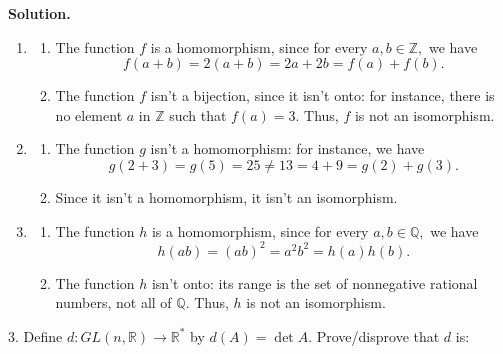 \documentclass[10pt,]{book}
\theoremstyle{plain}
\theoremstyle{definition}
\theoremstyle{definition}
\theoremstyle{definition}
\theoremstyle{definition}
\numberwithin{equation}{section}
\def\Z{\mathbb{Z}}
\def\R{\mathbb{R}}
\def\Q{\mathbb{Q}}
\begin{document}
\begin{exerciselist}
\begin{enumerate}[label=(\alph*)]
\end{enumerate}
%
\par\smallskip
\par\smallskip
\noindent\textbf{Solution.}\hypertarget{solution-22}{}\quad
\leavevmode%
\begin{enumerate}[label=(\alph*)]
\item\hypertarget{li-168}{}%
\begin{enumerate}[label=\roman*.]
\item\hypertarget{li-169}{}The function \(f\) is a homomorphism, since for every \(a,b \in
\Z,\) we have%
\begin{equation*}
f(a+b)=2(a+b)=2a+2b=f(a)+f(b).
\end{equation*}
%
\item\hypertarget{li-170}{}The function \(f\) isn't a bijection, since it isn't onto: for instance, there is no element \(a\) in \(\Z\) such that \(f(a)=3\). Thus, \(f\) is not an isomorphism.%
\end{enumerate}
%
\item\hypertarget{li-171}{}%
\begin{enumerate}[label=\roman*.]
\item\hypertarget{li-172}{}The function \(g\) isn't a homomorphism: for instance, we have%
\begin{equation*}
g(2+3)=g(5)=25\neq 13=4+9=g(2)+g(3).
\end{equation*}
%
\item\hypertarget{li-173}{}Since it isn't a homomorphism, it isn't an isomorphism.%
\end{enumerate}
%
\item\hypertarget{li-174}{}%
\begin{enumerate}[label=\roman*.]
\item\hypertarget{li-175}{}The function \(h\) is a homomorphism, since for every \(a,b \in
\Q,\) we have%
\begin{equation*}
h(ab)=(ab)^2=a^2b^2=h(a)h(b).
\end{equation*}
%
\item\hypertarget{li-176}{}The function \(h\) isn't onto: its range is the set of nonnegative rational numbers, not all of \(\Q\). Thus, \(h\) is not an isomorphism.%
\end{enumerate}
%
\end{enumerate}
\item[3.]\hypertarget{exercise-23}{}Define \(d : GL(n,\R)\to \R^*\) by \(d(A)=\det A\). Prove/disprove that \(d\) is: \leavevmode%
\begin{enumerate}[label=(\alph*)]

\end{enumerate}
\end{exerciselist}
\end{document}
